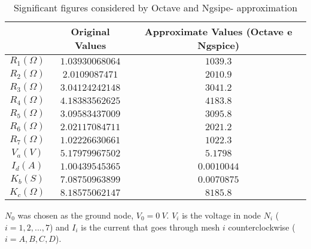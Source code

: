 \begin{table}[hbt!]
\centering
\begin{tabular}{|c|c|c|}
\hline
        &           \textbf{Original Values}        & \textbf{Approximate Values (Octave e Ngspice)}\\ \hline
 $R_1 (\Omega)$   &  $   1.03930068064   $     & $1039.3$\\ \hline
 $R_2 (\Omega)$   &  $   2.0109087471    $      & $2010.9$\\ \hline
 $R_3 (\Omega)$   &  $   3.04124242148   $    & $3041.2$\\ \hline
 $R_4 (\Omega)$   &  $   4.18383562625   $     & $4183.8$\\ \hline
 $R_5 (\Omega)$   &  $   3.09583437009   $     & $3095.8$\\ \hline
 $R_6 (\Omega)$   &  $   2.02117084711   $     & $2021.2$\\ \hline
 $R_7 (\Omega)$   &  $   1.02226630661   $     & $1022.3$\\\hline
 $V_a (V)$   &  $   5.17979967502   $     & $5.1798$\\ \hline
 $I_d (A)$   &  $    1.00439545365     $     & $0.0010044$\\ \hline
 $K_b (S)$   &  $    7.08750963899     $     & $0.0070875$\\ \hline
 $K_c (\Omega)$   &     $8.18575062147    $     & $8185.8$\\ \hline
\end{tabular}
\caption{Significant figures considered by Octave and Ngsipe- approximation} 
\label{tab:ap}
\end{table}

\par
$N_0$ was chosen as the ground node, $V_0 = 0 \ V$. $V_i$ is the voltage in node $N_i$ ($i=1, 2, ..., 7$) and $I_i$  is the current that goes through mesh $i$ counterclockwise ($i=A, B, C, D$).


